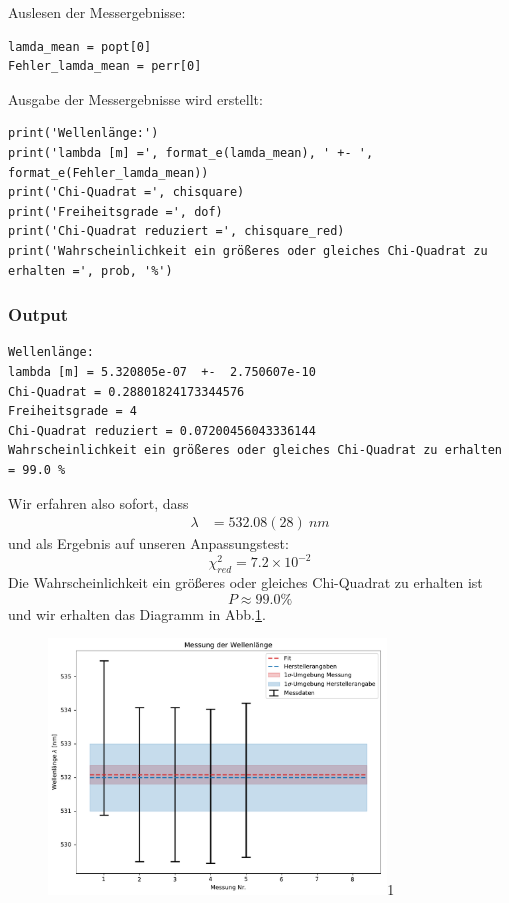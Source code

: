 \documentclass[a4paper,10pt]{article}
\begin{document}
Auslesen der Messergebnisse:\begin{lstlisting}
lamda_mean = popt[0]
Fehler_lamda_mean = perr[0]

\end{lstlisting}

Ausgabe der Messergebnisse wird erstellt:\begin{lstlisting}
print('Wellenlänge:')
print('lambda [m] =', format_e(lamda_mean), ' +- ', format_e(Fehler_lamda_mean))
print('Chi-Quadrat =', chisquare)
print('Freiheitsgrade =', dof)
print('Chi-Quadrat reduziert =', chisquare_red)
print('Wahrscheinlichkeit ein größeres oder gleiches Chi-Quadrat zu erhalten =', prob, '%')

\end{lstlisting}

\subsubsection{Output}
\begin{lstlisting}
Wellenlänge:
lambda [m] = 5.320805e-07  +-  2.750607e-10
Chi-Quadrat = 0.28801824173344576
Freiheitsgrade = 4
Chi-Quadrat reduziert = 0.07200456043336144
Wahrscheinlichkeit ein größeres oder gleiches Chi-Quadrat zu erhalten = 99.0 %

\end{lstlisting}
Wir erfahren also sofort, dass
\begin{align*}
\lambda&=532.08(28)\:nm
\end{align*}
und als Ergebnis auf unseren Anpassungstest:
\[\chi^{2}_{red}=7.2\times10^{-2}\]
Die Wahrscheinlichkeit ein größeres oder gleiches Chi-Quadrat zu erhalten ist
 \[P\approx  99.0 \%\]
und wir erhalten das Diagramm in Abb.\ref{fig:Fig1}.

\begin{figure}[htb]
  \centering
  \begin{annotate}{\includegraphics[width=0.8\textwidth]{232_Fig1.pdf}}{1}
  \end{annotate}
\caption{}
\label{fig:Fig1}
\end{figure}
\pagebreak
\end{document}
